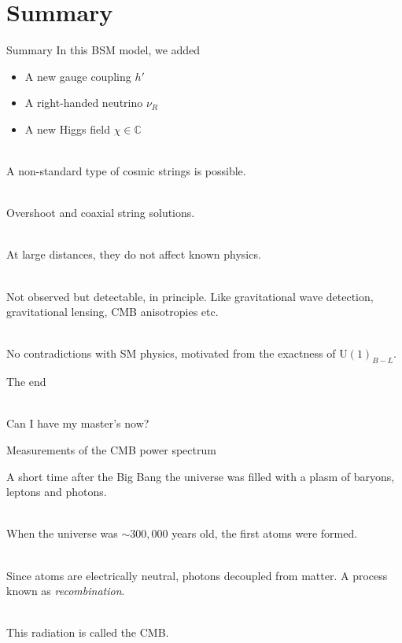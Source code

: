 \documentclass[14pt]{beamer}
\begin{document}
\section{Summary}
\begin{frame}{Summary}
In this BSM model, we added
\begin{itemize}
	\item A new gauge coupling $h'$ 
	\item A right-handed neutrino $\nu_R$
	\item A new Higgs field $\chi\in\mathbb{C}$ \\~\

\end{itemize}

A non-standard type of cosmic strings is possible.\\~\

Overshoot and coaxial string solutions. \\~\
 
At large distances, they do not affect known physics.\\~\


\end{frame}
 
\begin{frame}


Not observed but detectable, in principle. Like gravitational wave detection, gravitational lensing, CMB anisotropies etc. \\~\

No contradictions with SM physics, motivated from the exactness of U$(1)_{B-L}$.
\end{frame}


\begin{frame}
	\centering
	\Huge The end\\~\
	
	\Large Can I have my master's now?
	
\end{frame}

\begin{frame}{Measurements of the CMB power spectrum}

A short time after the Big Bang the universe was filled with a plasm of baryons, leptons and photons.\\~\

When the universe was $\sim 300,000$ years old, the first atoms were formed. \\~\

Since atoms are electrically neutral, photons decoupled from matter. A process known as \textit{recombination}.\\~\

This radiation is called the CMB.

\end{frame}
\end{document}
